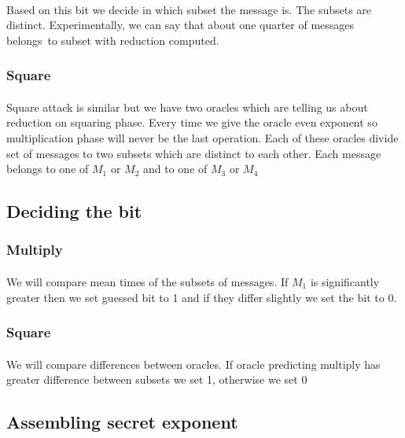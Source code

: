 \documentclass[thesis=B,english]{FITthesis}[2012/10/20]
\begin{document}
{\paragraph*{}
{
Based on this bit we decide in which subset the message is. The subsets are distinct. Experimentally, we can say that about one quarter of messages belongs~to
subset with reduction computed.
}
\subsubsection{Square}
\paragraph*{}{
Square attack is similar but we have two oracles which are telling us about reduction on squaring phase. Every time we give the oracle even exponent so 
multiplication phase will never be the last operation. Each of these oracles divide set of messages to two subsets which are distinct to each other. Each message 
belongs to one of \(M_1\) or \(M_2\) and to one of \(M_3\) or \(M_4\)
}

\subsection{Deciding the bit}

\subsubsection{Multiply}
\paragraph*{}{
We will compare mean times of the subsets of messages. If \(M_1\) is significantly greater then we set guessed bit to 1 and if they differ slightly we set the bit to 0. 

}

\subsubsection{Square}
\paragraph*{}{
We will compare differences between oracles. If oracle predicting multiply has greater difference between subsets we set 1, otherwise we set 0
}

\subsection{Assembling secret exponent}
}
\end{document}
